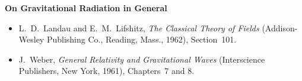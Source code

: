 

\medskip
\noindent\textbf{On Gravitational Radiation in General}\par
\begin{itemize}
  \item[\(\square\)] L.~D.~Landau and E.~M.~Lifshitz,
  \emph{The Classical Theory of Fields} (Addison-Wesley Publishing Co.,
  Reading, Mass., 1962), Section~101.

  \item[\(\square\)] J.~Weber,
  \emph{General Relativity and Gravitational Waves} (Interscience Publishers,
  New York, 1961), Chapters~7 and 8.
\end{itemize}

